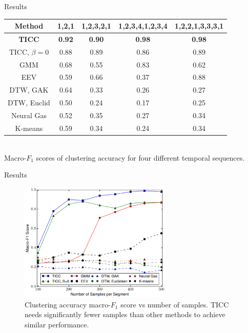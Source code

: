 \documentclass{beamer}
\begin{document}
\begin{frame}{Results}
	\begin{center}
	\begin{tabular}{c||c|c|c|c}
		\hline
		 Method & 1,2,1 & 1,2,3,2,1 & 1,2,3,4,1,2,3,4 & 1,2,2,1,3,3,3,1 \\ \hline\hline
		 \textbf{TICC} & \textbf{0.92} & \textbf{0.90} & \textbf{0.98} & \textbf{0.98} \\ \hline
		 TICC, $\beta=0$ & 0.88 & 0.89 & 0.86 & 0.89 \\ \hline
		 GMM & 0.68 & 0.55 & 0.83 & 0.62 \\ \hline
		 EEV & 0.59 & 0.66 & 0.37 & 0.88 \\ \hline
		 DTW, GAK & 0.64 & 0.33 & 0.26 & 0.27 \\ \hline 
		 DTW, Euclid & 0.50 & 0.24 & 0.17 & 0.25 \\ \hline
		 Neural Gas & 0.52 & 0.35 & 0.27 & 0.34 \\ \hline
		 K-means & 0.59 & 0.34 & 0.24 & 0.34 \\ \hline
	\end{tabular}
	\\
	\vspace{.25cm}
	Macro-$F_1$ scores of clustering accuracy for four different temporal sequences.
	\end{center}
\end{frame}


\begin{frame}{Results}
	\begin{figure}
		\includegraphics[width=7.25cm]{fig4.eps}
		\caption*{\centering Clustering accuracy macro-$F_1$ score vs number of samples. TICC needs significantly fewer samples than other methods to achieve similar performance.}
	\end{figure}
\end{frame}
\end{document}

